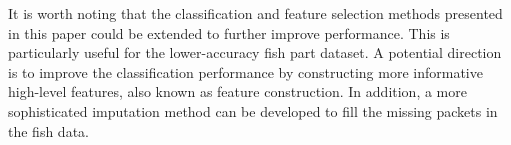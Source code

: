 \documentclass[runningheads]{llncs}
\begin{document}
It is worth noting that the classification and feature selection methods presented in this paper could be extended to further improve performance. 
This is particularly useful for the lower-accuracy fish part dataset. 
A potential direction is to improve the classification performance by constructing more informative high-level features, also known as feature construction. 
In addition, a more sophisticated imputation method can be developed to fill the missing packets in the fish data.





\end{document}
